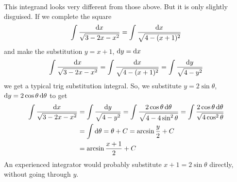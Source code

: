 \begin{solution} 
This integrand looks very different from those above. But it is
only slightly disguised. If we complete the square
\begin{align*}
\int \frac{\mathrm{d}x}{\sqrt{3-2x-x^2}}
  = \int \frac{\mathrm{d}x}{\sqrt{4-(x+1)^2}}
\end{align*}
and make the substitution $y=x+1$, $\mathrm{d}y=\mathrm{d}x$
\begin{align*}
\int \frac{\mathrm{d}x}{\sqrt{3-2x-x^2}}
  = \int \frac{\mathrm{d}x}{\sqrt{4-(x+1)^2}}
  = \int \frac{\mathrm{d}y}{\sqrt{4-y^2}}
\end{align*}
we get a typical trig substitution integral. So, we substitute
$y=2\sin\theta$, $\mathrm{d}y=2\cos\theta\,\mathrm{d}\theta$ to get
\begin{align*}
\int \frac{\mathrm{d}x}{\sqrt{3-2x-x^2}}
&= \int \frac{\mathrm{d}y}{\sqrt{4-y^2}}
  = \int\frac{2\cos\theta\,\mathrm{d}\theta}{\sqrt{4-4\sin^2\theta}}
  = \int\frac{2\cos\theta\,\mathrm{d}\theta}{\sqrt{4\cos^2\theta}}\\
  &=\int\mathrm{d}\theta
  =\theta +C
  =\arcsin\frac{y}{2} + C \\
&=\arcsin\frac{x+1}{2} + C
\end{align*}
An experienced integrator would probably substitute $x+1 = 2\sin\theta$
directly, without going through $y$. 


\end{solution}

